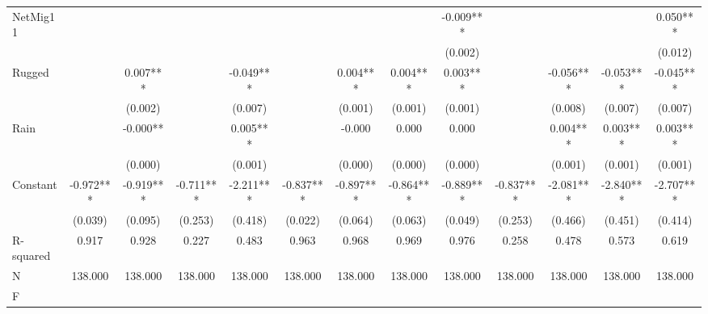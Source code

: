 {\begin{tabular}{l*{12}{c}}
NetMig11            &               &               &               &               &               &               &               &      -0.009***&               &               &               &       0.050***\\
                    &               &               &               &               &               &               &               &     (0.002)   &               &               &               &     (0.012)   \\
Rugged              &               &       0.007***&               &      -0.049***&               &       0.004***&       0.004***&       0.003***&               &      -0.056***&      -0.053***&      -0.045***\\
                    &               &     (0.002)   &               &     (0.007)   &               &     (0.001)   &     (0.001)   &     (0.001)   &               &     (0.008)   &     (0.007)   &     (0.007)   \\
Rain                &               &      -0.000** &               &       0.005***&               &      -0.000   &       0.000   &       0.000   &               &       0.004***&       0.003***&       0.003***\\
                    &               &     (0.000)   &               &     (0.001)   &               &     (0.000)   &     (0.000)   &     (0.000)   &               &     (0.001)   &     (0.001)   &     (0.001)   \\
Constant            &      -0.972***&      -0.919***&      -0.711***&      -2.211***&      -0.837***&      -0.897***&      -0.864***&      -0.889***&      -0.837***&      -2.081***&      -2.840***&      -2.707***\\
                    &     (0.039)   &     (0.095)   &     (0.253)   &     (0.418)   &     (0.022)   &     (0.064)   &     (0.063)   &     (0.049)   &     (0.253)   &     (0.466)   &     (0.451)   &     (0.414)   \\
\hline
R-squared           &       0.917   &       0.928   &       0.227   &       0.483   &       0.963   &       0.968   &       0.969   &       0.976   &       0.258   &       0.478   &       0.573   &       0.619   \\
N                   &     138.000   &     138.000   &     138.000   &     138.000   &     138.000   &     138.000   &     138.000   &     138.000   &     138.000   &     138.000   &     138.000   &     138.000   \\
F                   &               &               &               &               &               &               &               &               &               &               &               &               \\
\hline\hline
\end{tabular}
}
